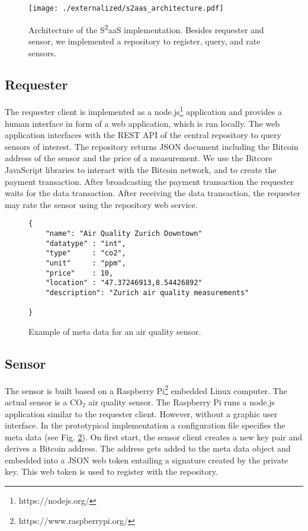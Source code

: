 \begin{figure}
\centering
\texttt{[image: ./externalized/s2aas\_architecture.pdf]}
\caption{Architecture of the S\textsuperscript{2}aaS implementation. Besides requester and sensor, we implemented a repository to register, query, and rate sensors.}
\label{fig:s2aasImplementation}
\end{figure}



\subsection{Requester}

The requester client is implemented as a node.js\footnote{https://nodejs.org/} application and provides a human interface in form of a web application, which is run locally. The web application interfaces with the \ac{REST} \ac{API} of the central repository to query sensors of interest. The repository returns \ac{JSON} document including the Bitcoin address of the sensor and the price of a measurement. We use the Bitcore JavaScript libraries to interact with the Bitcoin network, and to create the payment transaction. After broadcasting the payment transaction the requester waits for the data transaction. After receiving the data transaction, the requester may rate the sensor using the repository web service. 

\begin{figure}
\begin{lstlisting}[basicstyle=\ttfamily\small]
{     
    "name": "Air Quality Zurich Downtown"
    "datatype" : "int",
    "type"     : "co2",
    "unit"     : "ppm",
    "price"    : 10,
    "location" : "47.37246913,8.54426892"
    "description": "Zurich air quality measurements"

}
\end{lstlisting}
\caption{Example of meta data for an air quality sensor.}
\label{fig:meta_data}
\end{figure}


\subsection{Sensor}
\label{sec:s2aas_implement_sensor}

The sensor is built based on a Raspberry Pi\footnote{https://www.raspberrypi.org/} embedded Linux computer. The actual sensor is a CO${_2}$ air quality sensor. The Raspberry Pi runs a node.js application similar to the requester client. However, without a graphic user interface. In the prototypical implementation a configuration file specifies the meta data (see Fig. \ref{fig:meta_data}). On first start, the sensor client creates a new key pair and derives a Bitcoin address. The address gets added to the meta data object and embedded into a \ac{JSON} web token entailing a signature created by the private key. This web token is used to register with the repository.

